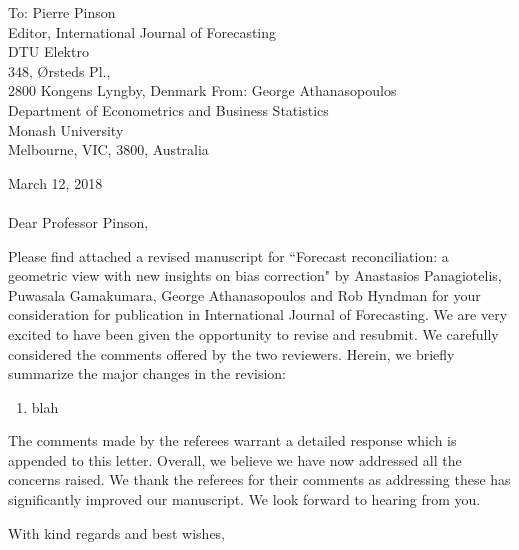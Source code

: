 \documentclass[11pt,a4paper]{letter}
\date{}
\begin{document}
 \begin{letter}{To: Pierre Pinson\\
 	Editor, International Journal of Forecasting\\
 	DTU Elektro\\
 	348, {\O}rsteds Pl., \\
 	2800 Kongens Lyngby, Denmark}
    From: George Athanasopoulos\\
    Department of Econometrics and Business Statistics\\
    Monash University\\
    Melbourne, VIC, 3800, Australia
 
 \opening{ March 12, 2018\\ \\Dear Professor Pinson,}
 \medskip

Please find attached a revised manuscript for ``Forecast reconciliation: a geometric view with new insights on bias correction" by Anastasios Panagiotelis, Puwasala Gamakumara, George Athanasopoulos and Rob Hyndman for your consideration for publication in International Journal of Forecasting. We are very excited to have been given the opportunity to revise and resubmit. We carefully considered the comments offered by the two reviewers. Herein, we briefly summarize the major changes in the revision:
\begin{enumerate}
	\item blah
\end{enumerate}

The comments made by the referees warrant a detailed response which is appended to this letter. Overall, we believe we have now addressed all the concerns raised. We thank the referees for their comments as addressing these has significantly improved our manuscript. We look forward to hearing from you.

 \closing{With kind regards and best wishes,}

 \end{letter}
\end{document}
